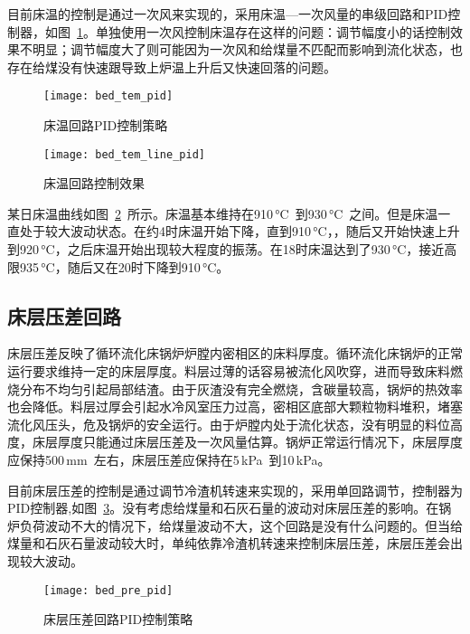 目前床温的控制是通过一次风来实现的，采用床温—一次风量的串级回路和PID控制器，如图~\ref{fig:bed_tem_pid}。单独使用一次风控制床温存在这样的问题：调节幅度小的话控制效果不明显；调节幅度大了则可能因为一次风和给煤量不匹配而影响到流化状态，也存在给煤没有快速跟导致上炉温上升后又快速回落的问题。
\begin{figure}[!htb]
\centering
\texttt{[image: bed\_tem\_pid]}
\caption{床温回路PID控制策略} \label{fig:bed_tem_pid}
\end{figure}

\begin{figure}[!htb]
\centering
\texttt{[image: bed\_tem\_line\_pid]}
\caption{床温回路控制效果} \label{fig:bed_tem_line_pid}
\end{figure}
 
某日床温曲线如图~\ref{fig:bed_tem_line_pid}~所示。床温基本维持在910$\,$\si{\degreeCelsius}~到930$\,$\si{\degreeCelsius}~之间。但是床温一直处于较大波动状态。在约4时床温开始下降，直到910$\,$\si{\degreeCelsius}，，随后又开始快速上升到920$\,$\si{\degreeCelsius}，之后床温开始出现较大程度的振荡。在18时床温达到了930$\,$\si{\degreeCelsius}，接近高限935$\,$\si{\degreeCelsius}，随后又在20时下降到910$\,$\si{\degreeCelsius}。



\subsection{床层压差回路}

床层压差反映了循环流化床锅炉炉膛内密相区的床料厚度。循环流化床锅炉的正常运行要求维持一定的床层厚度。料层过薄的话容易被流化风吹穿，进而导致床料燃烧分布不均匀引起局部结渣。由于灰渣没有完全燃烧，含碳量较高，锅炉的热效率也会降低。料层过厚会引起水冷风室压力过高，密相区底部大颗粒物料堆积，堵塞流化风压头，危及锅炉的安全运行。由于炉膛内处于流化状态，没有明显的料位高度，床层厚度只能通过床层压差及一次风量估算。锅炉正常运行情况下，床层厚度应保持500$\,$\si{\mm}~左右，床层压差应保持在5$\,$\si{\kilo\pascal}~到10$\,$\si{\kilo\pascal}。
 
目前床层压差的控制是通过调节冷渣机转速来实现的，采用单回路调节，控制器为PID控制器,如图~\ref{fig:bed_pre_pid}。没有考虑给煤量和石灰石量的波动对床层压差的影响。在锅炉负荷波动不大的情况下，给煤量波动不大，这个回路是没有什么问题的。但当给煤量和石灰石量波动较大时，单纯依靠冷渣机转速来控制床层压差，床层压差会出现较大波动。

\begin{figure}[!htb]
\centering
\texttt{[image: bed\_pre\_pid]}
\caption{床层压差回路PID控制策略} \label{fig:bed_pre_pid}
\end{figure}


